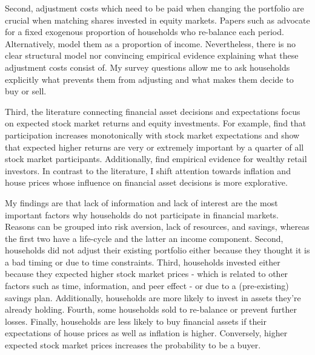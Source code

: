\documentclass[ProjectABM]{subfiles}
\begin{document}
Second, adjustment costs which need to be paid when changing the portfolio are crucial when matching shares invested in equity markets. Papers such as \cite{giglio_et_al_2019five} advocate for a fixed exogenous proportion of households who re-balance each period. Alternatively,  \cite{bonaparte_et_al_2012adjustment} model them as a proportion of income. Nevertheless, there is no clear structural model nor convincing empirical evidence explaining what these adjustment costs consist of. My survey questions allow me to ask households explicitly what prevents them from adjusting and what makes them decide to buy or sell.

Third, the literature connecting financial asset decisions and expectations focus on expected stock market returns and equity investments. For example, \cite{arrondel_et_al_2014subjective_return_expectation} find that participation increases monotonically with stock market expectations and \cite{choi_2020} show that expected higher returns are very or extremely important by a quarter of all stock market participants. %
 Additionally, \cite{giglio_et_al_2019five} find empirical evidence for wealthy retail investors. In contrast to the literature, I shift attention towards inflation and house prices whose influence on financial asset decisions is more explorative. %


My findings are that lack of information and lack of interest are the most important factors why households do not participate in financial markets. Reasons can be grouped into risk aversion, lack of resources, and savings, whereas the first two have a life-cycle and the latter an income component. Second, households did not adjust their existing portfolio either because they thought it is a bad timing or due to time constraints. Third, households invested either because they expected higher stock market prices - which is related to other factors such as time, information, and peer effect - or due to a (pre-existing) savings plan. Additionally, households are more likely to invest in assets they're already holding. Fourth, some households sold to re-balance or prevent further losses. Finally, households are less likely to buy financial assets if their expectations of house prices as well as inflation is higher. Conversely, higher expected stock market prices increases the probability to be a buyer.
\end{document}
